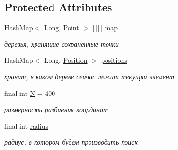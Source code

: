 \subsection*{Protected Attributes}
\begin{DoxyCompactItemize}
\item 
\mbox{\label{classcom_1_1verify_1_1_nearest_points_ae28c825a69910065f6588070c7c23ca0}} 
Hash\+Map$<$ Long, Point $>$ \mbox{[}$\,$\mbox{]}\mbox{[}$\,$\mbox{]} \mbox{\hyperlink{classcom_1_1verify_1_1_nearest_points_ae28c825a69910065f6588070c7c23ca0}{map}}
\begin{DoxyCompactList}\small\item\em деревья, хранящие сохраненные точки \end{DoxyCompactList}\item 
\mbox{\label{classcom_1_1verify_1_1_nearest_points_a0ac03be6036b10e296fa3adb5a2954c5}} 
Hash\+Map$<$ Long, \mbox{\hyperlink{classcom_1_1verify_1_1_nearest_points_1_1_position}{Position}} $>$ \mbox{\hyperlink{classcom_1_1verify_1_1_nearest_points_a0ac03be6036b10e296fa3adb5a2954c5}{positions}}
\begin{DoxyCompactList}\small\item\em хранит, в каком дереве сейчас лежит текущий элемент \end{DoxyCompactList}\item 
\mbox{\label{classcom_1_1verify_1_1_nearest_points_a60ff1851e20c3975043a3f4891c44bf1}} 
final int \mbox{\hyperlink{classcom_1_1verify_1_1_nearest_points_a60ff1851e20c3975043a3f4891c44bf1}{N}} = 400
\begin{DoxyCompactList}\small\item\em размерность разбиения координат \end{DoxyCompactList}\item 
\mbox{\label{classcom_1_1verify_1_1_nearest_points_accea8abe3aba66b446543f4596c7ffbf}} 
final int \mbox{\hyperlink{classcom_1_1verify_1_1_nearest_points_accea8abe3aba66b446543f4596c7ffbf}{radius}}
\begin{DoxyCompactList}\small\item\em радиус, в котором будем производить поиск \end{DoxyCompactList}\end{DoxyCompactItemize}


